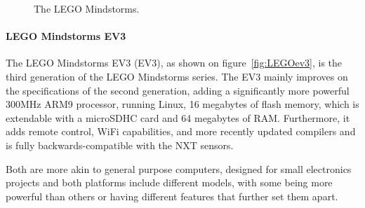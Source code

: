 \begin{figure}[!tbp]
	\centering
	\hfill
	\caption{The LEGO Mindstorms.}
\end{figure}

\paragraph{LEGO Mindstorms EV3}
The LEGO Mindstorms EV3 (EV3), as shown on figure~\autoref{fig:LEGOev3}, is the third generation of the LEGO Mindstorms series.
The EV3 mainly improves on the specifications of the second generation, adding a significantly more powerful 300MHz ARM9 processor, running Linux, 16 megabytes of flash memory, which is extendable with a microSDHC card and 64 megabytes of RAM\cite{ev3userguide}.
Furthermore, it adds remote control, WiFi capabilities, and more recently updated compilers and is fully backwards-compatible with the NXT sensors\cite{ev3nxtcompatability}.

Both are more akin to general purpose computers, designed for small electronics projects and both platforms include different models, with some being more powerful than others or having different features that further set them apart.


